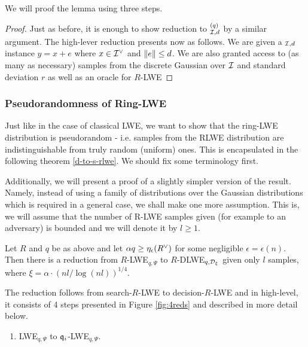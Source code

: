 We will proof the lemma using three steps.
\begin{proof}
	Just as before, it is enough to show reduction to $^{(q)}_{\mathcal{I},d}$ by a similar argument. The high-lever reduction presents now as follows. We are given a $_{\mathcal{I}, d}$ instance $y = x + e$ where $x \in \mathcal{I}^{\vee}$ and $\norm{e} \leq d$. We are also granted access to (as many as necessary) samples from the discrete Gaussian over $\mathcal{I}$ and standard deviation $r$ as well as an oracle for $R$-LWE 
\end{proof}
\subsubsection{Pseudorandomness of Ring-LWE}\label{pseudo-rlwe}
Just like in the case of classical LWE, we want to show that the ring-LWE distribution is pseudorandom - i.e. samples from the RLWE distribution are indistinguishable from truly random (uniform) ones. This is encapsulated in the following theorem \ref{d-to-s-rlwe}. We should fix some terminology first.

Additionally, we will present a proof of a slightly simpler version of the result. Namely, instead of using a family of distributions over the Gaussian distributions which is required in a general case, we shall make one more assumption. This is, we will assume that the number of R-LWE samples given (for example to an adversary) is bounded and we will denote it by $l \geq 1$.
\begin{theorem}\label{d-to-s-rlwe}
	Let $R$ and $q$ be as above and let $\alpha q \geq \eta_{\epsilon}(R^{\vee})$ for some negligible $\epsilon = \epsilon(n)$. Then there is a reduction from $R$-LWE$_{q,\Psi}$ to $R$-DLWE$_{q,\mathcal{D}_{\xi}}$ given only $l$ samples, where $\xi = \alpha \cdot (nl/\log(nl))^{1/4}$.
\end{theorem}
The reduction follows from search-$R$-LWE to decision-$R$-LWE and in high-level, it consists of 4 steps presented in Figure \ref{fig:4reds} and described in more detail below.
\begin{enumerate}
	\item LWE$_{q, \Psi}$ to $\mathfrak{q}_i$-LWE$_{q, \Psi}$.
\end{enumerate}

